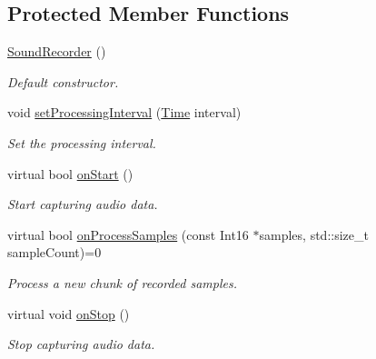 \subsection*{Protected Member Functions}
\begin{DoxyCompactItemize}
\item 
\mbox{\hyperlink{classsf_1_1_sound_recorder_a50ebad413c4f157408a0fa49f23212a9}{Sound\+Recorder}} ()
\begin{DoxyCompactList}\small\item\em Default constructor. \end{DoxyCompactList}\item 
void \mbox{\hyperlink{classsf_1_1_sound_recorder_a85b7fb8a86c08b5084f8f142767bccf6}{set\+Processing\+Interval}} (\mbox{\hyperlink{classsf_1_1_time}{Time}} interval)
\begin{DoxyCompactList}\small\item\em Set the processing interval. \end{DoxyCompactList}\item 
virtual bool \mbox{\hyperlink{classsf_1_1_sound_recorder_a7af418fb036201d3f85745bef78ce77f}{on\+Start}} ()
\begin{DoxyCompactList}\small\item\em Start capturing audio data. \end{DoxyCompactList}\item 
virtual bool \mbox{\hyperlink{classsf_1_1_sound_recorder_a2670124cbe7a87c7e46b4840807f4fd7}{on\+Process\+Samples}} (const Int16 $\ast$samples, std\+::size\+\_\+t sample\+Count)=0
\begin{DoxyCompactList}\small\item\em Process a new chunk of recorded samples. \end{DoxyCompactList}\item 
virtual void \mbox{\hyperlink{classsf_1_1_sound_recorder_aefc36138ca1e96c658301280e4a31b64}{on\+Stop}} ()
\begin{DoxyCompactList}\small\item\em Stop capturing audio data. \end{DoxyCompactList}\end{DoxyCompactItemize}

